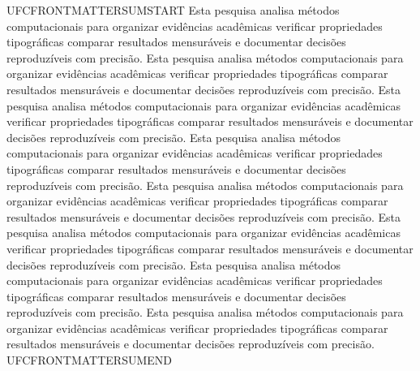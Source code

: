 UFCFRONTMATTERSUMSTART Esta pesquisa analisa métodos computacionais para organizar evidências acadêmicas verificar propriedades tipográficas comparar resultados mensuráveis e documentar decisões reproduzíveis com precisão. Esta pesquisa analisa métodos computacionais para organizar evidências acadêmicas verificar propriedades tipográficas comparar resultados mensuráveis e documentar decisões reproduzíveis com precisão. Esta pesquisa analisa métodos computacionais para organizar evidências acadêmicas verificar propriedades tipográficas comparar resultados mensuráveis e documentar decisões reproduzíveis com precisão. Esta pesquisa analisa métodos computacionais para organizar evidências acadêmicas verificar propriedades tipográficas comparar resultados mensuráveis e documentar decisões reproduzíveis com precisão. Esta pesquisa analisa métodos computacionais para organizar evidências acadêmicas verificar propriedades tipográficas comparar resultados mensuráveis e documentar decisões reproduzíveis com precisão. Esta pesquisa analisa métodos computacionais para organizar evidências acadêmicas verificar propriedades tipográficas comparar resultados mensuráveis e documentar decisões reproduzíveis com precisão. Esta pesquisa analisa métodos computacionais para organizar evidências acadêmicas verificar propriedades tipográficas comparar resultados mensuráveis e documentar decisões reproduzíveis com precisão. Esta pesquisa analisa métodos computacionais para organizar evidências acadêmicas verificar propriedades tipográficas comparar resultados mensuráveis e documentar decisões reproduzíveis com precisão. UFCFRONTMATTERSUMEND

